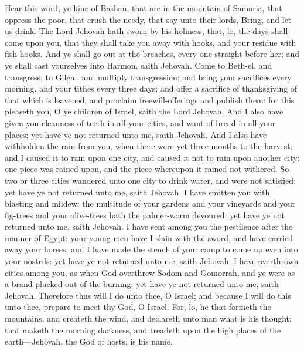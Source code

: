 Hear this word, ye kine of Bashan, that are in the mountain of Samaria, that oppress the poor, that crush the needy, that say unto their lords, Bring, and let us drink. The Lord Jehovah hath sworn by his holiness, that, lo, the days shall come upon you, that they shall take you away with hooks, and your residue with fish-hooks. And ye shall go out at the breaches, every one straight before her; and ye shall cast yourselves into Harmon, saith Jehovah.  Come to Beth-el, and transgress; to Gilgal, and multiply transgression; and bring your sacrifices every morning, and your tithes every three days; and offer a sacrifice of thanksgiving of that which is leavened, and proclaim freewill-offerings and publish them: for this pleaseth you, O ye children of Israel, saith the Lord Jehovah.  And I also have given you cleanness of teeth in all your cities, and want of bread in all your places; yet have ye not returned unto me, saith Jehovah. And I also have withholden the rain from you, when there were yet three months to the harvest; and I caused it to rain upon one city, and caused it not to rain upon another city: one piece was rained upon, and the piece whereupon it rained not withered. So two or three cities wandered unto one city to drink water, and were not satisfied: yet have ye not returned unto me, saith Jehovah. I have smitten you with blasting and mildew: the multitude of your gardens and your vineyards and your fig-trees and your olive-trees hath the palmer-worm devoured: yet have ye not returned unto me, saith Jehovah. I have sent among you the pestilence after the manner of Egypt: your young men have I slain with the sword, and have carried away your horses; and I have made the stench of your camp to come up even into your nostrils: yet have ye not returned unto me, saith Jehovah. I have overthrown cities among you, as when God overthrew Sodom and Gomorrah, and ye were as a brand plucked out of the burning: yet have ye not returned unto me, saith Jehovah.  Therefore thus will I do unto thee, O Israel; and because I will do this unto thee, prepare to meet thy God, O Israel. For, lo, he that formeth the mountains, and createth the wind, and declareth unto man what is his thought; that maketh the morning darkness, and treadeth upon the high places of the earth—Jehovah, the God of hosts, is his name. 

